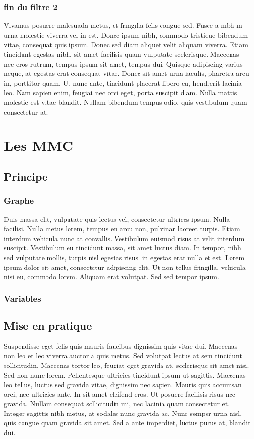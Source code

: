 \documentclass[a4paper,12pt]{report} %
\begin{document}
        \subsection{fin du filtre 2}
        	Vivamus posuere malesuada metus, et fringilla felis congue sed. Fusce a nibh in urna molestie viverra vel in est. Donec ipsum nibh, commodo tristique bibendum vitae, consequat quis ipsum. Donec sed diam aliquet velit aliquam viverra. Etiam tincidunt egestas nibh, sit amet facilisis quam vulputate scelerisque. Maecenas nec eros rutrum, tempus ipsum sit amet, tempus dui. Quisque adipiscing varius neque, at egestas erat consequat vitae. Donec sit amet urna iaculis, pharetra arcu in, porttitor quam. Ut nunc ante, tincidunt placerat libero eu, hendrerit lacinia leo. Nam sapien enim, feugiat nec orci eget, porta suscipit diam. Nulla mattis molestie est vitae blandit. Nullam bibendum tempus odio, quis vestibulum quam consectetur at. 
    \chapter{Les MMC}
        \section{Principe}
            \subsection{Graphe}
            	Duis massa elit, vulputate quis lectus vel\cite{ref1}, consectetur ultrices ipsum. Nulla facilisi. Nulla metus lorem, tempus eu arcu non, pulvinar laoreet turpis. Etiam interdum vehicula nunc at convallis. Vestibulum euismod risus at velit interdum suscipit. Vestibulum eu tincidunt massa, sit amet luctus diam. In tempor, nibh sed vulputate mollis, turpis nisl egestas risus, in egestas erat nulla et est. Lorem ipsum dolor sit amet, consectetur adipiscing elit. Ut non tellus fringilla, vehicula nisi eu, commodo lorem. Aliquam erat volutpat. Sed sed tempor ipsum.
            \subsection{Variables}
        \section{Mise en pratique}
        	Suspendisse eget felis quis mauris faucibus dignissim quis vitae dui\cite{ref1}. Maecenas non leo et leo viverra auctor a quis metus. Sed volutpat lectus at sem tincidunt sollicitudin. Maecenas tortor leo, feugiat eget gravida at, scelerisque sit amet nisi. Sed non nunc lorem. Pellentesque ultricies tincidunt ipsum ut sagittis. Maecenas leo tellus, luctus sed gravida vitae\cite{ref2}, dignissim nec sapien. Mauris quis accumsan orci, nec ultricies ante. In sit amet eleifend eros. Ut posuere facilisis risus nec gravida. Nullam consequat sollicitudin mi, nec lacinia quam consectetur et. Integer sagittis nibh metus, at sodales nunc gravida ac. Nunc semper urna nisl, quis congue quam gravida sit amet. Sed a ante imperdiet, luctus purus at, blandit dui.
\end{document}
